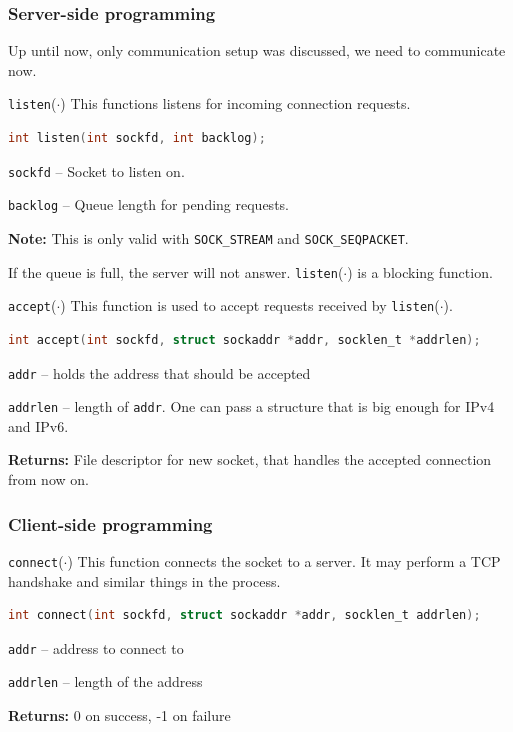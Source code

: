 \documentclass[english]{panikzettel}
\newcommand{\fkt}[1]{\texttt{#1}(\(\cdot\))}
\begin{document}
	\subsubsection{Server-side programming}

	Up until now, only communication setup was discussed, we need to communicate now.

	\begin{defi}{\fkt{listen}}
		This functions listens for incoming connection requests.
		\begin{lstlisting}[language=C]
				int listen(int sockfd, int backlog);
		\end{lstlisting}
		\tcblower
		\texttt{sockfd} – Socket to listen on.	
		
		\texttt{backlog} – Queue length for pending requests.
	
		\textbf{Note:} This is only valid with \texttt{SOCK\_STREAM} and \texttt{SOCK\_SEQPACKET}.
	\end{defi}
	If the queue is full, the server will not answer.
	\fkt{listen} is a blocking function.

	\begin{defi}{\fkt{accept}}
		This function is used to accept requests received by \fkt{listen}.
		\begin{lstlisting}[language=C]
			int accept(int sockfd, struct sockaddr *addr, socklen_t *addrlen);
		\end{lstlisting}
		\tcblower
		\texttt{addr} – holds the address that should be accepted
		
		\texttt{addrlen} – length of \texttt{addr}. One can pass a structure that is big enough for IPv4 and IPv6.

		\textbf{Returns:} File descriptor for new socket, that handles the accepted connection from now on.
	\end{defi}

	\subsubsection{Client-side programming}

	\begin{defi}{\fkt{connect}}
		This function connects the socket to a server.
		It may perform a TCP handshake and similar things in the process.
		\begin{lstlisting}[language=C]
			int connect(int sockfd, struct sockaddr *addr, socklen_t addrlen);
		\end{lstlisting}
		\tcblower
		\texttt{addr} – address to connect to

		\texttt{addrlen} – length of the address

		\textbf{Returns:} 0 on success, -1 on failure
	\end{defi}
	
\end{document}
